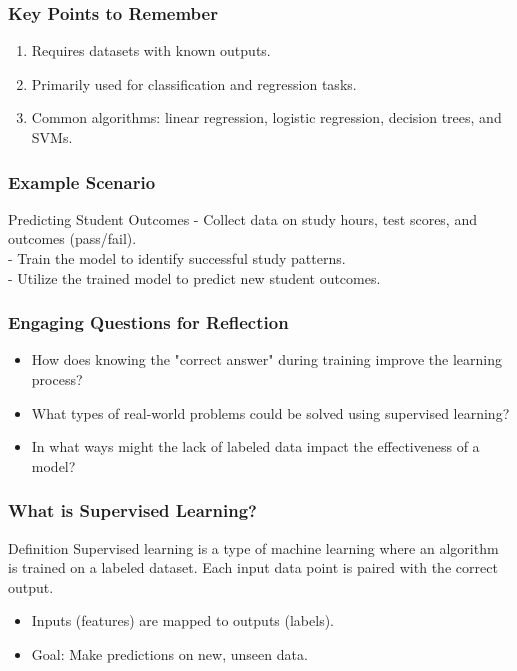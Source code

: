 \documentclass[aspectratio=169]{beamer}
\begin{document}
\begin{frame}[fragile]
    \frametitle{Key Points to Remember}
    \begin{enumerate}
        \item Requires datasets with known outputs.
        \item Primarily used for classification and regression tasks.
        \item Common algorithms: linear regression, logistic regression, decision trees, and SVMs.
    \end{enumerate}
\end{frame}

\begin{frame}[fragile]
    \frametitle{Example Scenario}
    \begin{block}{Predicting Student Outcomes}
        - Collect data on study hours, test scores, and outcomes (pass/fail).\\
        - Train the model to identify successful study patterns.\\
        - Utilize the trained model to predict new student outcomes.
    \end{block}
\end{frame}

\begin{frame}[fragile]
    \frametitle{Engaging Questions for Reflection}
    \begin{itemize}
        \item How does knowing the "correct answer" during training improve the learning process?
        \item What types of real-world problems could be solved using supervised learning?
        \item In what ways might the lack of labeled data impact the effectiveness of a model?
    \end{itemize}
\end{frame}

\begin{frame}[fragile]
    \frametitle{What is Supervised Learning?}
    \begin{block}{Definition}
        Supervised learning is a type of machine learning where an algorithm is trained on a labeled dataset. Each input data point is paired with the correct output.
    \end{block}
    
    \begin{itemize}
        \item Inputs (features) are mapped to outputs (labels).
        \item Goal: Make predictions on new, unseen data.
    \end{itemize}
\end{frame}
\end{document}
